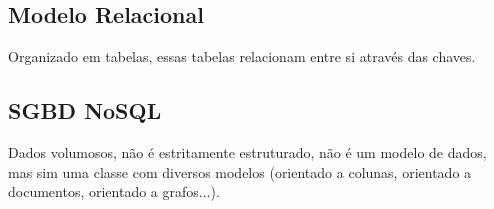 \documentclass[ ]{article}
\begin{document}
		\subsection{Modelo Relacional}
			Organizado em tabelas, essas tabelas relacionam entre si através das chaves.
		\subsection{SGBD NoSQL}
			Dados volumosos, não é estritamente estruturado, não é um modelo de dados, mas sim uma classe com diversos modelos (orientado a colunas, orientado a documentos, orientado a grafos...).
\end{document}

